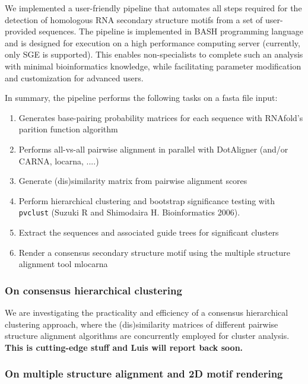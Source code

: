 \documentclass[a4paper,twoside]{article}
\newcommand\pvclust{\texttt{pvclust}}
\begin{document}
\noindent We implemented a user-friendly pipeline that automates all steps required 
for the detection of homologous RNA secondary structure motifs from a set of user-
provided sequences. The pipeline is implemented in BASH programming language and is 
designed for execution on a high performance computing server (currently, only SGE 
is supported). This enables non-specialists to complete such an analysis with 
minimal bioinformatics knowledge, while facilitating parameter modification and 
customization for advanced users. 

In summary, the pipeline performs the following tasks on a fasta file input:
\begin{enumerate}
\item Generates base-pairing probability matrices for each sequence with RNAfold's parition function algorithm 
\item Performs all-vs-all pairwise alignment in parallel with DotAligner (and/or CARNA, locarna, ....)
\item Generate (dis)similarity matrix from pairwise alignment scores 
\item Perform hierarchical clustering and bootstrap significance testing with \pvclust{} (Suzuki R and Shimodaira H. Bioinformatics 2006).
\item Extract the sequences and associated guide trees for significant clusters
\item Render a consensus secondary structure motif using the multiple structure alignment tool mlocarna
\end{enumerate}


\subsubsection{ On consensus hierarchical clustering }

We are investigating the practicality and efficiency of a consensus
hierarchical clustering approach, where the (dis)similarity matrices of
different pairwise structure alignment algorithms are concurrently employed for
cluster analysis. \textbf{This is cutting-edge stuff and Luis will report back
soon. }


\subsubsection{ On multiple structure alignment and 2D motif rendering }
\end{document}
